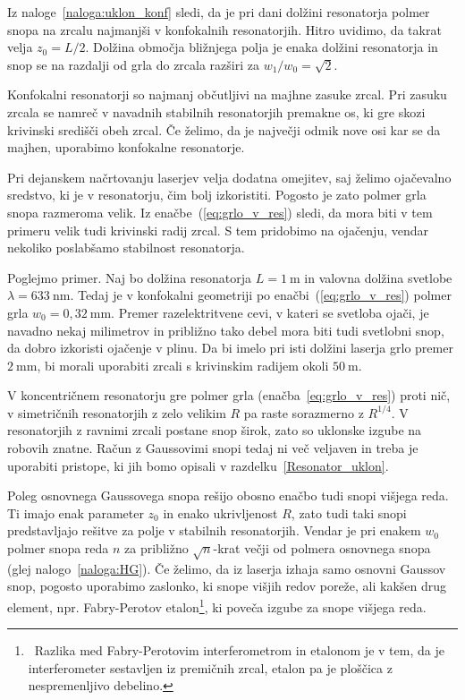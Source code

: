 Iz naloge~\ref{naloga:uklon_konf} sledi, da je pri dani dolžini 
resonatorja polmer snopa na zrcalu najmanjši v konfokalnih 
resonatorjih.  Hitro uvidimo, da takrat 
velja $z_{0}=L/2$. Dolžina območja bližnjega polja je 
enaka dolžini resonatorja in snop se na razdalji od grla do zrcala razširi
za $w_1/w_0=\sqrt{2}$. 
\begin{remark}
Konfokalni resonatorji so najmanj občutljivi na majhne zasuke zrcal. 
Pri zasuku zrcala se namreč v navadnih stabilnih resonatorjih premakne os, ki gre skozi 
krivinski središči obeh zrcal. Če želimo, da je največji odmik nove osi kar se da
majhen, uporabimo konfokalne resonatorje. 
\end{remark}
Pri dejanskem načrtovanju laserjev velja dodatna omejitev, saj želimo 
ojačevalno sredstvo, ki je v resonatorju, čim bolj izkoristiti. Pogosto je zato 
polmer grla snopa razmeroma velik. Iz enačbe~(\ref{eq:grlo_v_res})
sledi, da mora biti v tem primeru velik tudi krivinski radij zrcal. S tem
pridobimo na ojačenju, vendar nekoliko poslabšamo stabilnost resonatorja.

Poglejmo primer. Naj bo dolžina resonatorja $L=1~\si{\metre}$ in valovna
dolžina svetlobe $\lambda = 633~\si{\nano\metre}$. Tedaj je v konfokalni geometriji po enačbi~(\ref{eq:grlo_v_res})
polmer grla $w_{0}=0,32~\si{\milli\metre}$. Premer razelektritvene cevi, v kateri se 
svetloba ojači, je navadno
nekaj milimetrov in približno tako debel mora biti tudi svetlobni
snop, da dobro izkoristi ojačenje v plinu.
Da bi imelo pri isti dolžini laserja grlo premer $2~\si{\milli\metre}$, bi morali
uporabiti zrcali s krivinskim radijem okoli $50~\si{\metre}$. 

V koncentričnem resonatorju gre polmer grla (enačba~\ref{eq:grlo_v_res}) proti nič, v
simetričnih resonatorjih z zelo velikim $R$ pa 
raste sorazmerno z $R^{1/4}$. V resonatorjih z ravnimi zrcali 
postane snop širok, zato so uklonske izgube na robovih znatne. 
Račun z Gaussovimi snopi tedaj ni več veljaven
in treba je uporabiti pristope, ki jih bomo opisali
v razdelku~\ref{Resonator_uklon}.

Poleg osnovnega Gaussovega snopa rešijo obosno enačbo tudi snopi višjega reda. 
Ti imajo enak parameter $z_{0}$ in enako ukrivljenost $R$, zato tudi taki snopi 
predstavljajo rešitve za polje v stabilnih resonatorjih. Vendar je pri enakem $w_{0}$
polmer snopa reda $n$ za približno $\sqrt{n}$-krat večji od polmera osnovnega snopa
(glej nalogo~\ref{naloga:HG}). Če želimo, da iz laserja izhaja samo 
osnovni Gaussov snop, 
pogosto uporabimo zaslonko, ki snope višjih redov poreže, 
ali kakšen drug element, npr. Fabry-Perotov etalon\footnote{~Razlika med Fabry-Perotovim
interferometrom in etalonom je v tem, da je interferometer sestavljen iz premičnih 
zrcal, etalon pa je ploščica z nespremenljivo debelino.}, ki poveča izgube za snope višjega reda.


